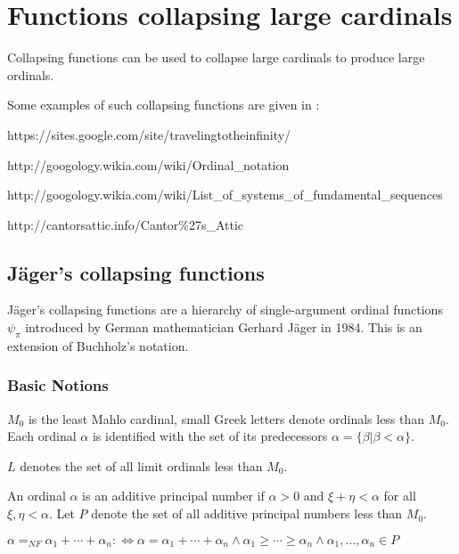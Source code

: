 \documentclass[10pt]{article}
\begin{document}
\section{Functions collapsing large cardinals}

Collapsing functions can be used to collapse large cardinals to produce large ordinals.

Some examples of such collapsing functions are given in :

https://sites.google.com/site/travelingtotheinfinity/

http://googology.wikia.com/wiki/Ordinal\_notation

http://googology.wikia.com/wiki/List\_of\_systems\_of\_fundamental\_sequences

http://cantorsattic.info/Cantor\%27s\_Attic

\begin{comment}
An example of such functions are the "Hypcos's functions" which collapses weakly inaccessible cardinals, described in

https://sites.google.com/site/travelingtotheinfinity/hypcos-s-notation-with-weakly-inaccessibles.
\end{comment}

\subsection{Jäger's collapsing functions}

Jäger's collapsing functions are a hierarchy of single-argument ordinal functions \(\psi_\pi\) introduced by German mathematician Gerhard Jäger in 1984. This is an extension of Buchholz's notation.


\subsubsection{Basic Notions}

\(M_0\) is the least Mahlo cardinal, small Greek letters denote ordinals less than \(M_0\). Each ordinal \(\alpha\) is identified with the set of its predecessors \(\alpha=\{\beta|\beta<\alpha\}\). 

\(L\) denotes the set of all limit ordinals less than \(M_0\).

An ordinal \(\alpha\) is an additive principal number if \(\alpha>0\) and \(\xi+\eta<\alpha\) for all \(\xi,\eta<\alpha\). Let \(P\) denote the set of all additive principal numbers less than \(M_0\).

\(\alpha=_{NF}\alpha _{1}+\cdots +\alpha _{n}:\Leftrightarrow \alpha =\alpha _{1}+\cdots +\alpha _{n}\wedge \alpha _{1}\geq \cdots \geq \alpha _{n}\wedge \alpha _{1},... ,\alpha _{n}\in P\)
\end{document}
